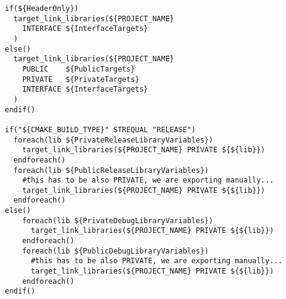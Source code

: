 \begin{frame}[fragile]
{\begin{verbatim}
if(${HeaderOnly})
  target_link_libraries(${PROJECT_NAME} 
    INTERFACE ${InterfaceTargets}
  )
else()
  target_link_libraries(${PROJECT_NAME} 
    PUBLIC    ${PublicTargets} 
    PRIVATE   ${PrivateTargets}
    INTERFACE ${InterfaceTargets}
  )
endif()

if("${CMAKE_BUILD_TYPE}" STREQUAL "RELEASE")
  foreach(lib ${PrivateReleaseLibraryVariables})
    target_link_libraries(${PROJECT_NAME} PRIVATE ${${lib}})
  endforeach()
  foreach(lib ${PublicReleaseLibraryVariables})
    #this has to be also PRIVATE, we are exporting manually...
    target_link_libraries(${PROJECT_NAME} PRIVATE ${${lib}})
  endforeach()
else()
    foreach(lib ${PrivateDebugLibraryVariables})
      target_link_libraries(${PROJECT_NAME} PRIVATE ${${lib}})
    endforeach()
    foreach(lib ${PublicDebugLibraryVariables})
      #this has to be also PRIVATE, we are exporting manually...
      target_link_libraries(${PROJECT_NAME} PRIVATE ${${lib}})
    endforeach()
endif()
\end{verbatim}
}
\end{frame}

